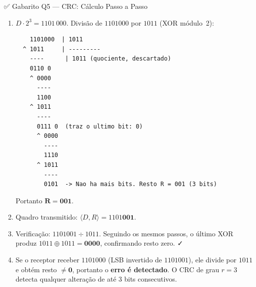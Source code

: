 \documentclass[11pt,a4paper]{article}
\begin{document}
\begin{gabaritocaixa}{✅ Gabarito Q5 --- CRC: Cálculo Passo a Passo}
\begin{enumerate}[label=(\alph*)]
    \item $D \cdot 2^3 = 1101\,000$. Divisão de $1101000$ por $1011$ (XOR módulo~2):
\begin{verbatim}
    1101000  | 1011
  ^ 1011     | ---------
    ----      | 1011 (quociente, descartado)
    0110 0
    ^ 0000
      ----
      1100
    ^ 1011
      ----
      0111 0  (traz o ultimo bit: 0)
      ^ 0000
        ----
        1110
      ^ 1011
        ----
        0101  -> Nao ha mais bits. Resto R = 001 (3 bits)
\end{verbatim}
    Portanto $\mathbf{R = 001}$.
    \item Quadro transmitido: $\langle D, R \rangle = 1101\mathbf{001}$.
    \item Verificação: $1101001 \div 1011$. Seguindo os mesmos passos, o último XOR produz $1011 \oplus 1011 = \mathbf{0000}$, confirmando resto zero. ✓
    \item Se o receptor receber $1101000$ (LSB invertido de $1101001$), ele divide por $1011$ e obtém resto $\mathbf{\neq 0}$, portanto o \textbf{erro é detectado}. O CRC de grau $r=3$ detecta qualquer alteração de até 3 bits consecutivos.
\end{enumerate}
\end{gabaritocaixa}
\end{document}

